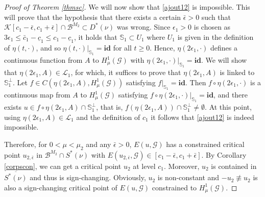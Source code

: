 \documentclass[10pt,a4paper]{article}
\theoremstyle{definition} \theoremstyle{remark}
\numberwithin{equation}{section}
\newcommand{\G}{\mathcal{G}}
\newcommand{\B}{\mathcal{B}}
\newcommand{\K}{\mathcal{K}}
\begin{document}
\begin{proof} [Proof of Theorem \ref{thmsc}]
We will now show that \eqref{ajout12} is impossible. This will prove that the hypothesis that there exists a certain $\bar{\epsilon} > 0$ such that $\K[c_1-\bar{\epsilon},c_1+\bar{\epsilon}] \cap \B^{M_2} \subset D^*(\nu)$ was wrong. Since $\epsilon_1 > 0$ is chosen as $3\epsilon_1 \leq \bar{c}_1 - \underline{c}_1 \leq c_1 - \underline{c}_1$, it holds that $\mathbb{S}_1 \subset U_1$ where $U_1$ is given in the definition of $\eta(t,\cdot)$, and so
$\eta(t,\cdot)|_{\mathbb{S}_1} = \textbf{id}$ for all $t \geq 0$. Hence, $\eta(2\epsilon_1,\cdot)$ defines a continuous function from $A$ to $H^1_\mu(\G)$ with
$\eta(2\epsilon_1,\cdot)|_{\mathbb{S}_1} = \textbf{id}$. We will show that $\eta(2\epsilon_1,A) \in \mathcal{L}_1$, for which, it suffices to prove that $\eta(2\epsilon_1,A)$ is linked to $\mathbb{S}_1^{\perp}$. Let $f \in C(\eta(2\epsilon_1,A),H_\mu^1(\G))$ satisfying $f|_{\mathbb{S}_1} = \textbf{id}$. Then $f \circ \eta(2\epsilon_1,\cdot)$ is a continuous map from $A$ to $H_\mu^1(\G)$ satisfying $f \circ \eta(2\epsilon_1,\cdot)|_{\mathbb{S}_1} = \textbf{id}$, and there exists $u \in f \circ \eta(2\epsilon_1,A) \cap \mathbb{S}_1^{\perp}$, that is, $f(\eta(2\epsilon_1,A)) \cap \mathbb{S}_1^{\perp} \neq \emptyset$. At this point, using $\eta(2\epsilon_1,A) \in \mathcal{L}_1$ and the definition of $c_1$ it follows that \eqref{ajout12} is indeed impossible.

Therefore, for $0 < \mu < \mu_2$ and any $\bar \epsilon > 0$, $E(u,\G)$ has a constrained critical point $u_{2,\bar \epsilon}$ in $\B^{M_2} \cap S^*(\nu)$ with $E(u_{2,\bar \epsilon},\G) \in [c_1 - \bar{\epsilon},c_1 + \bar{\epsilon}]$. By Corollary \ref{corpscon}, we can get a critical point $u_2$ at level $c_1$. Moreover, $u_2$ is contained in $\overline{S^*(\nu)}$ and thus is sign-changing. Obviously, $u_2$ is non-constant and $-u_2 \not\equiv u_2$ is also a sign-changing critical point of $E(u,\G)$ constrained to $H^1_\mu(\G)$.


\end{proof}
\end{document}
